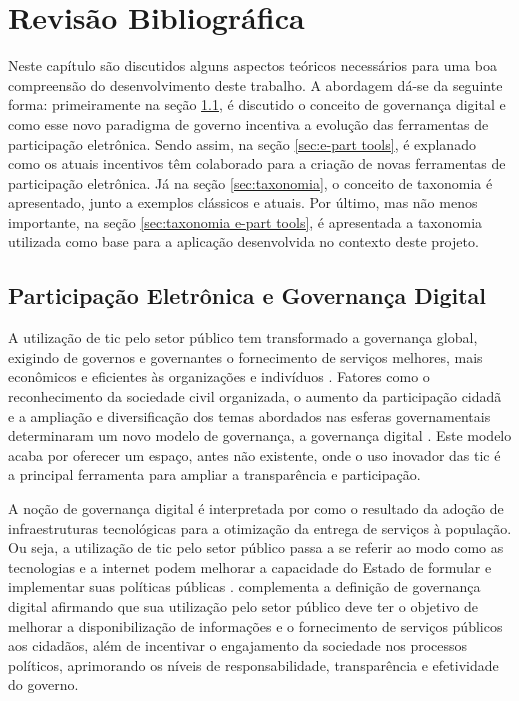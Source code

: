 \chapter[Revisão Bibliográfica]{Revisão Bibliográfica} 
\label{cap:cap2}
Neste capítulo são discutidos alguns aspectos teóricos necessários para uma boa compreensão do desenvolvimento deste trabalho. A abordagem dá-se da seguinte forma:
primeiramente na seção \ref{sec:e-part}, é discutido o conceito de governança digital e como esse novo paradigma de governo incentiva a evolução das ferramentas de 
participação eletrônica. Sendo assim, na seção \ref{sec:e-part tools}, é explanado como os atuais incentivos têm colaborado para a criação de novas ferramentas de 
participação eletrônica. Já na seção \ref{sec:taxonomia}, o conceito de taxonomia é apresentado, junto a exemplos clássicos e atuais. Por último, mas não menos importante, 
na seção \ref{sec:taxonomia e-part tools}, é apresentada a taxonomia utilizada como base para a aplicação desenvolvida no contexto deste projeto. 


\section{Participação Eletrônica e Governança Digital}
\label{sec:e-part}
\par
A utilização de \acrshort{tic} pelo setor público tem transformado a governança global, exigindo de governos e governantes o fornecimento de serviços melhores, 
mais econômicos e eficientes às organizações e indivíduos \cite{afdb2014uneca}. Fatores como o reconhecimento da sociedade civil organizada, o aumento da participação cidadã e a 
ampliação e diversificação dos temas abordados nas esferas governamentais determinaram um novo modelo de governança, a governança digital \cite{o2011government}. 
Este modelo acaba por oferecer um espaço, antes não existente, onde o uso inovador das \acrshort{tic} é a principal ferramenta para ampliar a transparência e participação.

\par
A noção de governança digital é interpretada por  como o resultado da adoção de infraestruturas tecnológicas para a otimização da entrega de 
serviços à população. Ou seja, a utilização de \acrshort{tic} pelo setor público passa a se referir ao modo como as tecnologias e a internet podem melhorar a capacidade do Estado 
de formular e implementar suas políticas públicas \cite{parra2017governancca}.  complementa a definição de governança digital afirmando que sua 
utilização pelo setor público deve ter o objetivo de melhorar a disponibilização de informações e o fornecimento de serviços públicos aos cidadãos, 
além de incentivar o engajamento da sociedade nos processos políticos, aprimorando os níveis de responsabilidade, transparência e efetividade do governo.

